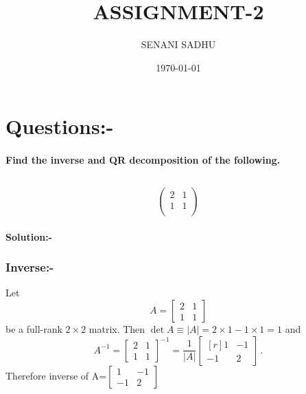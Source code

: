 \documentclass[a4paper,12pt]{article}
\title{ASSIGNMENT-2}
\author{SENANI SADHU}
\date{\today}
\begin{document}
	\maketitle
	\section{Questions:-}
	\paragraph{Find the inverse and QR decomposition of the
		following.}
	\subsection{}
	\begin{equation}
		\begin{pmatrix}
			2 & 1\\
			1 & 1\\
		\end{pmatrix}
	\end{equation}
\paragraph{Solution:-}
\subsubsection{Inverse:-}
Let
\[
A = \begin{bmatrix}
	2 & 1 \\ 
	1 & 1
\end{bmatrix}
\]
be a full-rank $2\times2$ matrix. 
Then $\det A\equiv\lvert A\rvert=2\times{1}-1\times{1}=1$ and 
\[
A^{-1}=\begin{bmatrix}
	2 & 1 \\ 
	1 & 1
\end{bmatrix}^{-1}
=\frac{1}{\lvert A\rvert}
\begin{bmatrix*}[r]
	1 & -1 \\ 
	-1 &  2
\end{bmatrix*} \,.
\]
Therefore inverse of A=$\begin{bmatrix}
	1 & -1\\
	-1 & 2
\end{bmatrix}$
\newline
\end{document}
